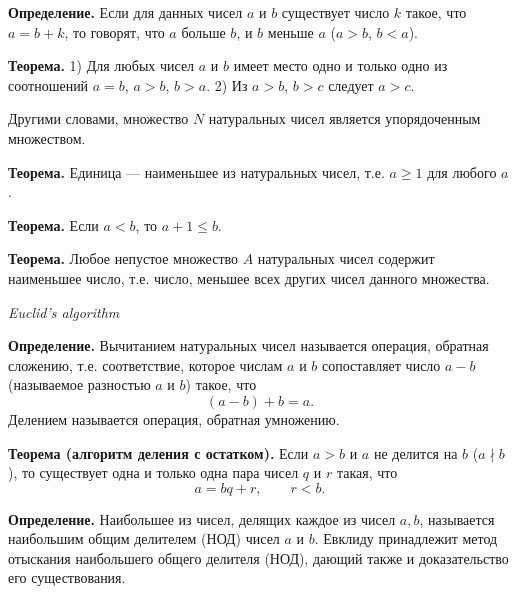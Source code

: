 \begin{rusblock}
\textbf{Определение.} Если для данных чисел $a$ и $b$ существует число $k$ такое, что $a=b+k$, то говорят, что $a$ больше $b$, и $b$ меньше $a$ ($a>b$, $b<a$).

\textbf{Теорема.} 1) Для любых чисел $a$ и $b$ имеет место одно и только одно из соотношений $a=b$, $a>b$, $b>a$. 2) Из $a>b$, $b>c$ следует $a>c$.

Другими словами, множество $N$ натуральных чисел является упорядоченным множеством.

\textbf{Теорема.} Единица --- наименьшее из натуральных чисел, т.е. $a\ge1$ для любого $a$.

\textbf{Теорема.} Если $a<b$, то $a+1\le b$.

\textbf{Теорема.} Любое непустое множество $A$ натуральных чисел содержит наименьшее число, т.е. число, меньшее всех других чисел данного множества.
\end{rusblock}

{\noindent\bfseries{}\par}
{\noindent\itshape Euclid's algorithm\par}
\begin{rusblock}
\textbf{Определение.} Вычитанием натуральных чисел называется операция, обратная сложению, т.е. соответствие, которое числам $a$ и $b$ сопоставляет число $a-b$ (называемое разностью $a$ и $b$) такое, что
\[
(a-b)+b=a.
\]
Делением называется операция, обратная умножению.

\textbf{Теорема (алгоритм деления с остатком).} Если $a>b$ и $a$ не делится на $b$ ($a\nmid b$), то существует одна и только одна пара чисел $q$ и $r$ такая, что
\[
a=bq+r,\qquad r<b.
\]

\textbf{Определение.} Наибольшее из чисел, делящих каждое из чисел $a,b$, называется наибольшим общим делителем (НОД) чисел $a$ и $b$. Евклиду принадлежит метод отыскания наибольшего общего делителя (НОД), дающий также и доказательство его существования.
\end{rusblock}

